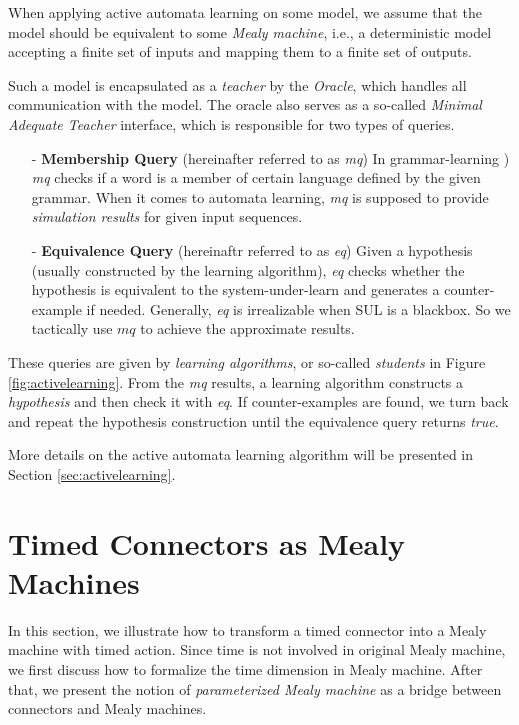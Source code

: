 \documentclass[conference, a4paper]{IEEEtran}
\begin{document}
When applying active automata learning on some model, we assume that the model should be equivalent
to some \emph{Mealy machine}, i.e., a deterministic model accepting a finite set of inputs and
mapping them to a finite set of outputs.

Such a model is encapsulated as a \emph{teacher} by the \emph{Oracle}, which handles
all communication with the model. The oracle also serves as a so-called \emph{Minimal Adequate Teacher}
interface, which is responsible for two types of queries. 

\begin{itemize}
  \item[-] \textbf{Membership Query} (hereinafter referred to as \emph{mq}) In grammar-learning
    \cite{DBLP:journals/iandc/Angluin87}) \emph{mq} checks if a word is a member of certain language
    defined by the given grammar. When it comes to
    automata learning, \emph{mq} is supposed to provide \emph{simulation results} for given input
    sequences.
  \item[-] \textbf{Equivalence Query} (hereinaftr referred to as \emph{eq}) Given a hypothesis
    (usually constructed by the learning algorithm), \emph{eq} checks whether the hypothesis is
    equivalent to the system-under-learn and generates a counter-example if needed. Generally, 
    \emph{eq} is irrealizable when SUL is a blackbox. So we tactically use $mq$ to achieve the
    approximate results.
\end{itemize}

These queries are given by \emph{learning algorithms}, or so-called \emph{students} in Figure
\ref{fig:activelearning}. From the \emph{mq} results, a learning algorithm constructs a
\emph{hypothesis} and then check it with \emph{eq}. If counter-examples are found, we turn back and
repeat the hypothesis construction until the equivalence query returns \emph{true}.

More details on the active automata learning algorithm will be presented in Section
\ref{sec:activelearning}. 

\section{Timed Connectors as Mealy Machines}
\label{sec:semantics}
In this section, we illustrate how to transform a timed connector into a Mealy machine with timed
action.
Since time is not involved in original Mealy machine, we first discuss how to formalize the time
dimension in Mealy machine. After that, we present the notion of \emph{parameterized Mealy
machine} as a bridge between connectors and Mealy machines.
\end{document}
